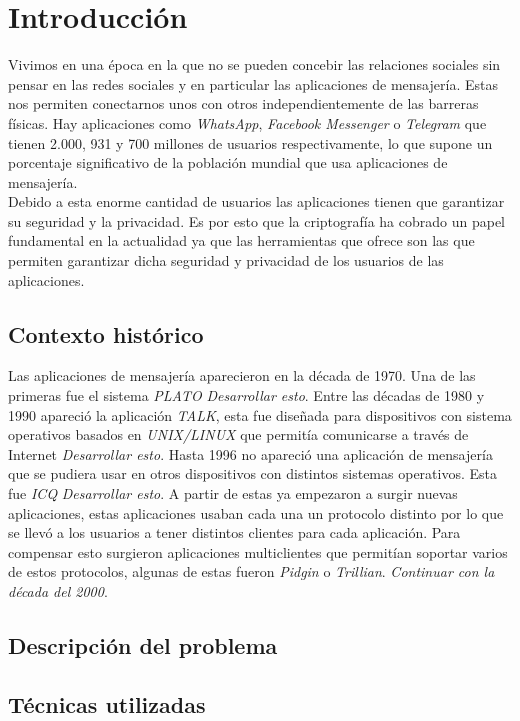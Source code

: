 \chapter{Introducción}
Vivimos en una época en la que no se pueden concebir las relaciones sociales sin pensar en las redes sociales y en particular las aplicaciones de mensajería. Estas nos permiten conectarnos unos con otros independientemente de las barreras físicas.
Hay aplicaciones como  \emph{WhatsApp}, \emph{Facebook Messenger} o \emph{Telegram} que tienen 2.000, 931 y 700 millones de usuarios respectivamente, lo que supone un porcentaje significativo de la población mundial que usa aplicaciones de mensajería.\\  
Debido a esta enorme cantidad de usuarios las aplicaciones tienen que garantizar su seguridad y la privacidad. Es por esto que la criptografía ha cobrado un papel fundamental en la actualidad ya que las herramientas que ofrece son las que permiten garantizar dicha seguridad y privacidad de los usuarios de las aplicaciones. 

\section{Contexto histórico}
Las aplicaciones de mensajería aparecieron en la década de 1970. Una de las primeras fue el sistema \emph{PLATO} \emph{Desarrollar esto}. Entre las décadas de 1980 y 1990 apareció la aplicación \emph{TALK}, esta fue diseñada para dispositivos con sistema operativos basados en \emph{UNIX/LINUX} que permitía comunicarse a través de Internet \emph{Desarrollar esto}. Hasta 1996 no apareció una aplicación de mensajería que se pudiera usar en otros dispositivos con distintos sistemas operativos. Esta fue \emph{ICQ} \emph{Desarrollar esto}. A partir de estas ya empezaron a surgir nuevas aplicaciones, estas aplicaciones usaban cada una un protocolo distinto por lo que se llevó a los usuarios a tener distintos clientes para cada aplicación. Para compensar esto surgieron aplicaciones multiclientes que permitían soportar varios de estos protocolos, algunas de estas fueron \emph{Pidgin} o \emph{Trillian}. \emph{Continuar con la década del 2000}.


\section{Descripción del problema}

\section{Técnicas utilizadas}
